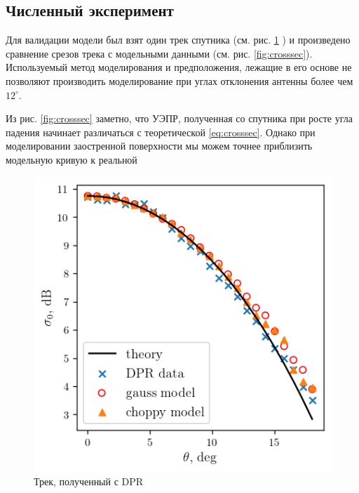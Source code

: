 
\subsection*{Численный эксперимент}%
\label{sub:chislennyi_eksperiment}




Для валидации модели был взят один трек спутника (см. рис. \ref{fig:track_dpr} ) и произведено сравнение срезов трека с
модельными данными (см. рис. \ref{fig:crosssec}). 
Используемый метод моделирования и предположения, лежащие в его
основе не позволяют производить моделирование при углах отклонения антенны более чем $12^\circ$. 

Из рис. \ref{fig:crosssec} заметно, что УЭПР, полученная со спутника при росте
угла падения начинает различаться с теоретической \eqref{eq:crosssec}. 
Однако при моделировании заостренной поверхности мы можем точнее приблизить
модельную кривую к реальной

\begin{figure}
    \centering
    \includegraphics[width=0.8\linewidth]{figs/real_crosssec.png}
    \caption{Трек, полученный с DPR}
    \label{fig:track_dpr}
\end{figure}





